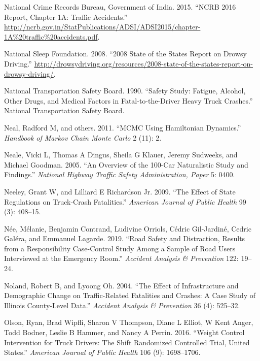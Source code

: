 \documentclass[12pt]{book}
\numberwithin{equation}{chapter}
\begin{document}
\leavevmode\hypertarget{ref-india2015}{}%
National Crime Records Bureau, Government of India. 2015. ``NCRB 2016 Report, Chapter 1A: Traffic Accidents.'' \url{http://ncrb.gov.in/StatPublications/ADSI/ADSI2015/chapter-1A\%20traffic\%20accidents.pdf}.

\leavevmode\hypertarget{ref-nsleepf}{}%
National Sleep Foundation. 2008. ``2008 State of the States Report on Drowsy Driving.'' \url{http://drowsydriving.org/resources/2008-state-of-the-states-report-on-drowsy-driving/}.

\leavevmode\hypertarget{ref-ntsb1990}{}%
National Transportation Safety Board. 1990. ``Safety Study: Fatigue, Alcohol, Other Drugs, and Medical Factors in Fatal-to-the-Driver Heavy Truck Crashes.'' National Transportation Safety Board.

\leavevmode\hypertarget{ref-neal2011mcmc}{}%
Neal, Radford M, and others. 2011. ``MCMC Using Hamiltonian Dynamics.'' \emph{Handbook of Markov Chain Monte Carlo} 2 (11): 2.

\leavevmode\hypertarget{ref-neale2005overview}{}%
Neale, Vicki L, Thomas A Dingus, Sheila G Klauer, Jeremy Sudweeks, and Michael Goodman. 2005. ``An Overview of the 100-Car Naturalistic Study and Findings.'' \emph{National Highway Traffic Safety Administration, Paper} 5: 0400.

\leavevmode\hypertarget{ref-neeley2009effect}{}%
Neeley, Grant W, and Lilliard E Richardson Jr. 2009. ``The Effect of State Regulations on Truck-Crash Fatalities.'' \emph{American Journal of Public Health} 99 (3): 408--15.

\leavevmode\hypertarget{ref-nee2019road}{}%
Née, Mélanie, Benjamin Contrand, Ludivine Orriols, Cédric Gil-Jardiné, Cedric Galéra, and Emmanuel Lagarde. 2019. ``Road Safety and Distraction, Results from a Responsibility Case-Control Study Among a Sample of Road Users Interviewed at the Emergency Room.'' \emph{Accident Analysis \& Prevention} 122: 19--24.

\leavevmode\hypertarget{ref-noland2004effect}{}%
Noland, Robert B, and Lyoong Oh. 2004. ``The Effect of Infrastructure and Demographic Change on Traffic-Related Fatalities and Crashes: A Case Study of Illinois County-Level Data.'' \emph{Accident Analysis \& Prevention} 36 (4): 525--32.

\leavevmode\hypertarget{ref-olson2016weight}{}%
Olson, Ryan, Brad Wipfli, Sharon V Thompson, Diane L Elliot, W Kent Anger, Todd Bodner, Leslie B Hammer, and Nancy A Perrin. 2016. ``Weight Control Intervention for Truck Drivers: The Shift Randomized Controlled Trial, United States.'' \emph{American Journal of Public Health} 106 (9): 1698--1706.
\end{document}
